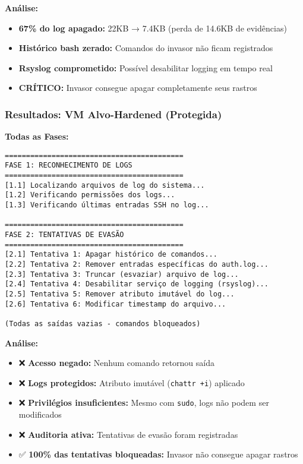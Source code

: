 \documentclass[12pt]{article}
\begin{document}
\textbf{Análise:}
\begin{itemize}
    \item \textbf{67\% do log apagado:} 22KB → 7.4KB (perda de 14.6KB de evidências)
    \item \textbf{Histórico bash zerado:} Comandos do invasor não ficam registrados
    \item \textbf{Rsyslog comprometido:} Possível desabilitar logging em tempo real
    \item \textbf{CRÍTICO:} Invasor consegue apagar completamente seus rastros
\end{itemize}

\subsubsection{Resultados: VM Alvo-Hardened (Protegida)}

\textbf{Todas as Fases:}
\begin{verbatim}
==========================================
FASE 1: RECONHECIMENTO DE LOGS
==========================================
[1.1] Localizando arquivos de log do sistema...
[1.2] Verificando permissões dos logs...
[1.3] Verificando últimas entradas SSH no log...

==========================================
FASE 2: TENTATIVAS DE EVASÃO
==========================================
[2.1] Tentativa 1: Apagar histórico de comandos...
[2.2] Tentativa 2: Remover entradas específicas do auth.log...
[2.3] Tentativa 3: Truncar (esvaziar) arquivo de log...
[2.4] Tentativa 4: Desabilitar serviço de logging (rsyslog)...
[2.5] Tentativa 5: Remover atributo imutável do log...
[2.6] Tentativa 6: Modificar timestamp do arquivo...

(Todas as saídas vazias - comandos bloqueados)
\end{verbatim}

\textbf{Análise:}
\begin{itemize}
    \item ❌ \textbf{Acesso negado:} Nenhum comando retornou saída
    \item ❌ \textbf{Logs protegidos:} Atributo imutável (\texttt{chattr +i}) aplicado
    \item ❌ \textbf{Privilégios insuficientes:} Mesmo com \texttt{sudo}, logs não podem ser modificados
    \item ❌ \textbf{Auditoria ativa:} Tentativas de evasão foram registradas
    \item ✅ \textbf{100\% das tentativas bloqueadas:} Invasor não consegue apagar rastros
\end{itemize}
\end{document}
